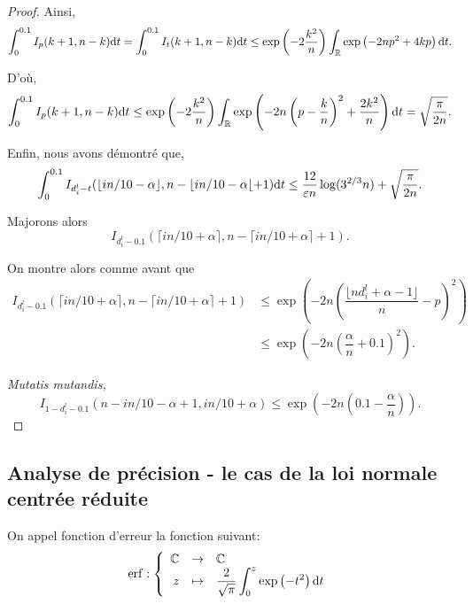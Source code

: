 \begin{proof}
    Ainsi,
    \begin{align*}
        \int_0^{0.1} I_{p}(k+1, n - k) \mathrm{d} t = \int_{0}^{0.1} I_{t}(k+1, n - k) \mathrm{d} t \leq \exp\left( -2\dfrac{{k}^2}{n} \right) \int_{\mathbb{R}} \exp\left( -2np^2 + 4{k} p \right)\mathrm{d} t.
    \end{align*}

    D'où, 
    \[
        \int_0^{0.1} I_{p}(k+1, n - k) \mathrm{d} t \leq \exp\left( -2\dfrac{{k}^2}{n} \right) \int_{\mathbb{R}} \exp\left( -2n\left( p - \dfrac{{k}}{n} \right)^2 + \dfrac{2{k}^2}{n} \right)\mathrm{d} t = \sqrt{\dfrac{\pi}{2n}}.    
    \]

    Enfin, nous avons démontré que,
    \begin{align}
        \int_{0}^{0.1}I_{d_i^l - t}(\lfloor in/10 - \alpha \rfloor, n - \lfloor in/10 -  \alpha\lfloor + 1) \mathrm{d} t \leq \dfrac{12}{\varepsilon n}\log(3^{2/3}n) + \sqrt{\dfrac{\pi}{2n}}.
    \end{align}

    Majorons alors
    \[
        I_{d_i^l - 0.1}(\lceil in/10 + \alpha \rceil , n - \lceil in/10 + \alpha\rceil + 1).    
    \]

    On montre alors comme avant que
    \begin{align*}
        I_{d_i^l - 0.1}(\lceil in/10 + \alpha \rceil , n - \lceil in/10 + \alpha\rceil + 1) & \leq \exp\left( -2n\left(\dfrac{\lfloor nd_i^l + \alpha - 1 \rfloor}{n} - p\right)^2 \right)\\
        &  \leq \exp\left( -2n\left( \dfrac{\alpha}{n} + 0.1 \right)^2 \right).
    \end{align*}

    \textit{Mutatis mutandis,}
    \[
        I_{1 - d_i^l - 0.1}(n - in/10 -  \alpha + 1, in/10 + \alpha) \leq \exp\left( -2n\left( 0.1 - \dfrac{\alpha}{n} \right) \right).
    \]
\end{proof}

\subsection{Analyse de précision - le cas de la loi normale centrée réduite}
\label{hmncr}



\begin{definition}
    On appel fonction d'erreur la fonction suivant:
    \[
        \erf: \left\{ 
        \begin{array}[]{rcl}
            \C &\to& \C\\
            z &\mapsto& \dfrac{2}{\sqrt \pi} \displaystyle\int_0^z\exp\left( -t^2 \right)\dt t
        \end{array}
        \right.
    \]
\end{definition}


